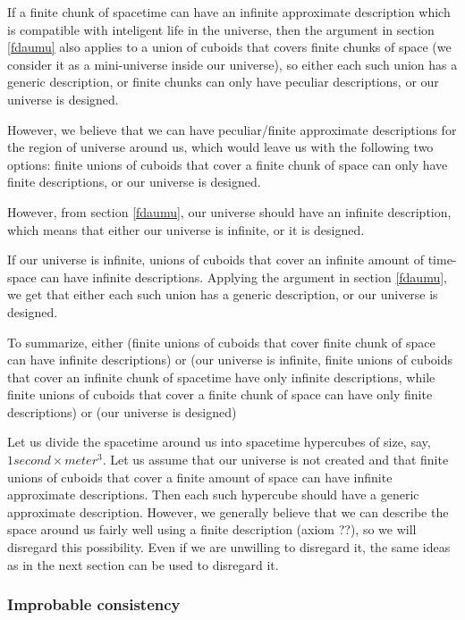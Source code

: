 \documentclass[a4paper
,draft
]{article}
\begin{document}
If a finite chunk of spacetime can have an infinite approximate
description which is compatible with inteligent life in the universe, then the
argument in section \ref{fdaumu} also applies to a union of cuboids that covers
finite chunks of space (we consider it as a mini-universe inside
our universe), so either each such union has a generic description,
or finite chunks can only have peculiar descriptions, or our universe
is designed.

However, we believe that we can have peculiar/finite approximate descriptions
for the region of universe around us, which would leave us with the following
two options: finite unions of cuboids that cover a finite chunk of space can
only have finite descriptions, or our universe is designed.

However, from section \ref{fdaumu}, our universe should have an
infinite description, which means that either our universe is infinite,
or it is designed.

If our universe is infinite, unions of cuboids that cover an infinite
amount of time-space can have infinite descriptions. Applying the argument
in section \ref{fdaumu}, we get that either each such union has a generic
description, or our universe is designed.

To summarize, either (finite unions of cuboids that cover finite chunk of space
can have infinite descriptions) or (our universe is infinite, finite unions of
cuboids that cover an infinite chunk of spacetime have only infinite
descriptions, while finite unions of cuboids that cover a finite chunk of
space can have only finite descriptions) or (our universe is designed)

Let us divide the spacetime around us into spacetime hypercubes of size, say,
$1 second \times meter^3$. Let us assume that our universe is not created
and that finite unions of cuboids that cover a finite amount of space
can have infinite approximate descriptions. Then each such hypercube should
have a generic approximate description. However, we generally believe that
we can describe the space around us fairly well using a finite description
(axiom ??), so we will disregard this possibility. Even if we are unwilling
to disregard it, the same ideas as in the next section can be used to
disregard it.

\subsubsection{Improbable consistency}
\end{document}

